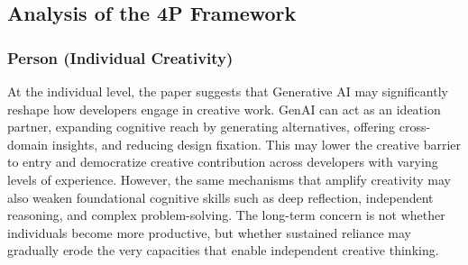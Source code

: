 \subsection{Analysis of the 4P Framework}
\subsubsection{Person (Individual Creativity)}

At the individual level, the paper suggests that Generative AI may significantly reshape how developers engage in creative work. GenAI can act as an ideation partner, expanding cognitive reach by generating alternatives, offering cross-domain insights, and reducing design fixation. This may lower the creative barrier to entry and democratize creative contribution across developers with varying levels of experience. However, the same mechanisms that amplify creativity may also weaken foundational cognitive skills such as deep reflection, independent reasoning, and complex problem-solving. The long-term concern is not whether individuals become more productive, but whether sustained reliance may gradually erode the very capacities that enable independent creative thinking.
